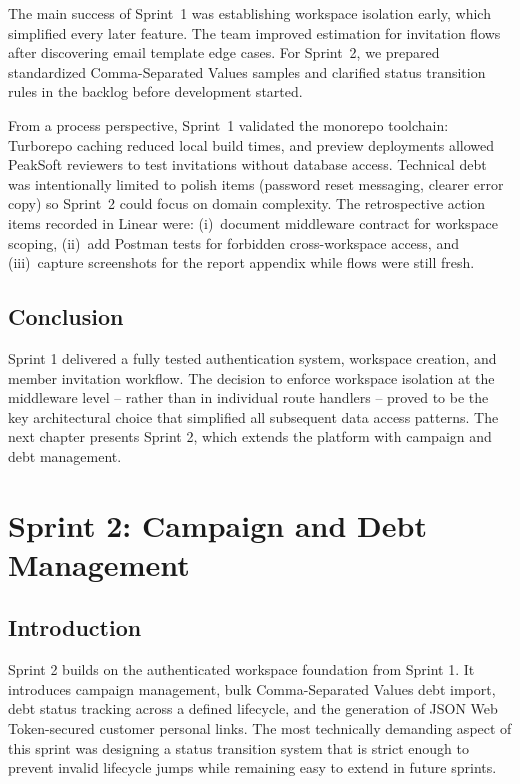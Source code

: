 \documentclass[12pt,a4paper]{report}
\begin{document}
The main success of Sprint~1 was establishing workspace isolation early, which simplified every
later feature.
The team improved estimation for invitation flows after discovering email template edge cases.
For Sprint~2, we prepared standardized Comma-Separated Values samples and clarified status
transition rules in the backlog before development started.

From a process perspective, Sprint~1 validated the monorepo toolchain: Turborepo caching reduced
local build times, and preview deployments allowed PeakSoft reviewers to test invitations without
database access.
Technical debt was intentionally limited to polish items (password reset messaging, clearer error
copy) so Sprint~2 could focus on domain complexity.
The retrospective action items recorded in Linear were: (i)~document middleware contract for
workspace scoping, (ii)~add Postman tests for forbidden cross-workspace access, and
(iii)~capture screenshots for the report appendix while flows were still fresh.

\section*{Conclusion}
{}

Sprint 1 delivered a fully tested authentication system, workspace creation, and
member invitation workflow.
The decision to enforce workspace isolation at the middleware level -- rather than
in individual route handlers -- proved to be the key architectural choice that
simplified all subsequent data access patterns.
The next chapter presents Sprint 2, which extends the platform with campaign and
debt management.

\clearpage
\chapter{Sprint 2: Campaign and Debt Management}
\label{chap:sprint2}

\section*{Introduction}
{}

Sprint 2 builds on the authenticated workspace foundation from Sprint 1.
It introduces campaign management, bulk Comma-Separated Values debt import, debt status tracking across
a defined lifecycle, and the generation of JSON Web Token-secured customer personal links.
The most technically demanding aspect of this sprint was designing a status
transition system that is strict enough to prevent invalid lifecycle jumps while
remaining easy to extend in future sprints.
\end{document}
